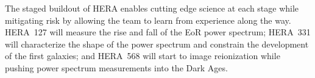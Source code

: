 \documentclass[preprint]{aastex}
\begin{document}


\noindent
The staged buildout of HERA enables cutting edge science at each stage while
mitigating risk by allowing the team to learn from experience along the way.
HERA~127 will measure the rise and fall of the EoR power spectrum; HERA~331
will characterize the shape of the power spectrum and constrain the development
of the first galaxies; and HERA~568 will start to image reionization while
pushing power spectrum measurements into the Dark Ages.
\end{document}
